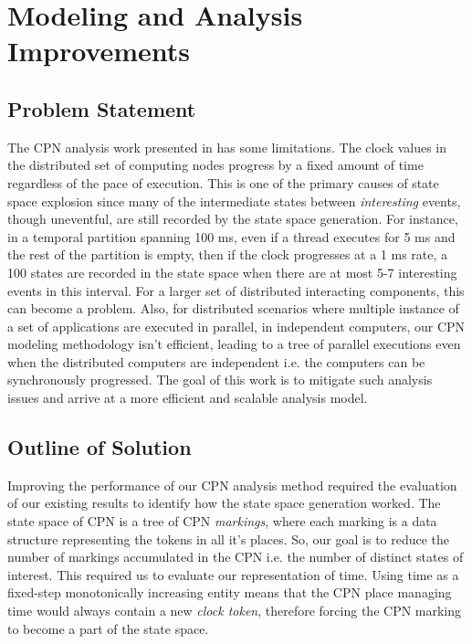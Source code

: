 \section{Modeling and Analysis Improvements}
\label{sec:Improvements}

\subsection{Problem Statement}

The CPN analysis work presented in \cite{kumar2014colored} has some limitations. The clock values in the distributed set of computing nodes progress by a fixed amount of time regardless of the pace of execution. This is one of the primary causes of state space explosion since many of the intermediate states between \emph{interesting} events, though uneventful, are still recorded by the state space generation. For instance, in a temporal partition spanning 100 ms, even if a thread executes for 5 ms and the rest of the partition is empty, then if the clock progresses at a 1 ms rate, a 100 states are recorded in the state space when there are at most 5-7 interesting events in this interval. For a larger set of distributed interacting components, this can become a problem. Also, for distributed scenarios where multiple instance of a set of applications are executed in parallel, in independent computers, our CPN modeling methodology isn't efficient, leading to a tree of parallel executions even when the distributed computers are independent i.e. the computers can be synchronously progressed. The goal of this work is to mitigate such analysis issues and arrive at a more efficient and scalable analysis model. 

\subsection{Outline of Solution}
Improving the performance of our CPN analysis method required the evaluation of our existing results to identify how the state space generation worked. The state space of CPN is a tree of CPN \emph{markings}, where each marking is a data structure representing the tokens in all it's places. So, our goal is to reduce the number of markings accumulated in the CPN i.e. the number of distinct states of interest. This required us to evaluate our representation of time. Using time as a fixed-step monotonically increasing entity means that the CPN place managing time would always contain a new \emph{clock token}, therefore forcing the CPN marking to become a part of the state space.

